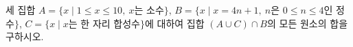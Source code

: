 세 집합 $A=\{x \mid 1\le x\le 10,\ x$는 소수$\}$, $B=\{x \mid x=4n+1,\ n$은 $0\le n\le 4$인 정수$\}$, $C=\{x \mid x$는 한 자리 합성수$\}$에 대하여 집합 $(A\cup C)\cap B$의 모든 원소의 합을 구하시오.
